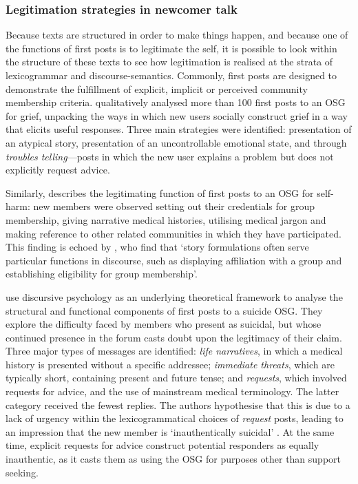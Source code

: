 \documentclass{article}
\begin{document}
\subsubsection{Legitimation strategies in newcomer talk}

Because texts are structured in order to make things happen, and because one of the functions of first posts is to legitimate the self, it is possible to look within the structure of these texts to see how legitimation is realised at the strata of lexicogrammar and discourse-semantics. Commonly, first posts are designed to demonstrate the fulfillment of explicit, implicit or perceived community membership criteria. \textcite{varga2014grieving} qualitatively analysed more than 100 first posts to an OSG for grief, unpacking the ways in which new users socially construct grief in a way that elicits useful responses. Three main strategies were identified: presentation of an atypical story, presentation of an uncontrollable emotional state, and through \emph{troubles telling}---posts in which the new user explains a problem but does not explicitly request advice.

Similarly, \textcite{smithson_membership_2011} describes the legitimating function of first posts to an OSG for self-harm: new members were observed setting out their credentials for group membership, giving narrative medical histories, utilising medical jargon and making reference to other related communities in which they have participated. This finding is echoed by \textcite[p.~5]{varga2014grieving}, who find that `story formulations often serve particular functions in discourse, such as displaying affiliation with a group and establishing eligibility for group membership'.

\textcite[p.~173]{horne_doing_2009} use discursive psychology as an underlying theoretical framework to analyse the structural and functional components of first posts to a suicide OSG. They explore the difficulty faced by members who present as suicidal, but whose continued presence in the forum casts doubt upon the legitimacy of their claim. Three major types of messages are identified: \emph{life narratives}, in which a medical history is presented without a specific addressee; \emph{immediate threats}, which are typically short, containing present and future tense; and \emph{requests}, which involved requests for advice, and the use of mainstream medical terminology. The latter category received the fewest replies. The authors hypothesise that this is due to a lack of urgency within the lexicogrammatical choices of \emph{request} posts, leading to an impression that the new member is `inauthentically suicidal' \parencite*[p.~180]{horne_doing_2009}. At the same time, explicit requests for advice construct potential responders as equally inauthentic, as it casts them as using the OSG for purposes other than support seeking. 
\end{document}
